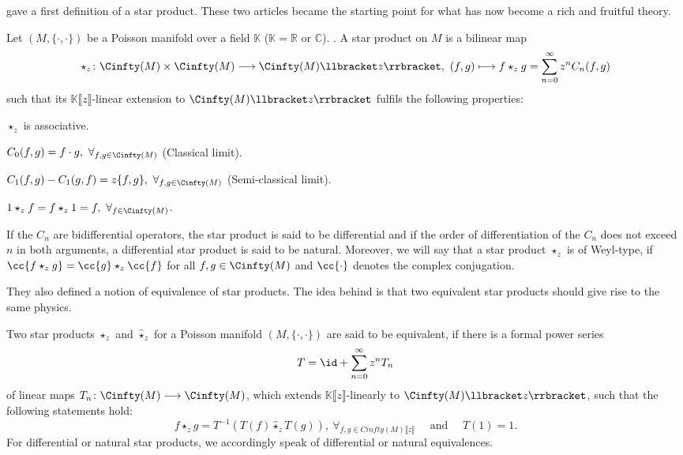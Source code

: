 gave a first definition of a star product. These two articles became the starting 
point for what has now become a rich and fruitful theory.
\begin{definition}
	\label{Def:StarProduct}
	Let $(M, \{\cdot, \cdot\})$ be a Poisson manifold over a field 
	$\mathbb{K}$ ($\mathbb{K} = \mathbb{R}$ or $\mathbb{C}$).
.	A star product on $M$ is a bilinear map
	\begin{equation*}
	    \star_z \colon 
    	\Cinfty(M) 
    	\times 
	    \Cinfty(M) 
	    \longrightarrow
	    \Cinfty(M) \llbracket z \rrbracket
	    , \
	    (f,g) 
	    \longmapsto 
	    f \star_z g 
	    =
	    \sum\limits_{n = 0}^\infty 
	    z^n C_n(f,g)
	\end{equation*}
	such that its $\mathbb{K}\llbracket z \rrbracket$-linear extension to 
	$\Cinfty(M) \llbracket z \rrbracket$ fulfils the following properties:
	\begin{definitionlist}
		\item
		$\star_z$ is associative.
		
		\item
		$C_0(f, g) = f \cdot g,\ \forall_{f,g \in \Cinfty(M)}$ (Classical limit).
		
		\item
		$C_1(f, g) - C_1(g, f)= z \{f, g\},\ \forall_{f,g \in \Cinfty(M)}$
		(Semi-classical limit).
		
		\item
		$1 \star_z f = f \star_z 1 = f,\ \forall_{f \in \Cinfty(M)}$.
	\end{definitionlist}
	If the $C_n$ are bidifferential operators, the star product is said to be 
	differential and if the order of differentiation of the $C_n$ does not 
	exceed $n$ in both arguments, a differential star product is said to be 
	natural. Moreover, we will say that a star product $\star_z$ is of Weyl-type,
	if $\cc{f \star_z g} = \cc{g} \star_z \cc{f}$ for all $f,g \in \Cinfty(M)$
	and $\cc{\cdot}$ denotes the complex conjugation.
\end{definition}
They also defined a notion of equivalence of star products. The idea behind is 
that two equivalent star products should give rise to the same physics.
\begin{definition}
	Two star products $\star_z$ and $\widehat{\star}_z$ for a Poisson manifold 
	$(M, \{\cdot, \cdot\})$ are said to be equivalent, if there is a formal 
	power series
	\begin{equation*}
		T
		=
		\id +
		\sum\limits_{n=0}^{\infty}
		z^n T_n
	\end{equation*}
	of linear maps $T_n \colon \Cinfty(M) \longrightarrow \Cinfty(M)$, which 
	extends $\mathbb{K}\llbracket z \rrbracket$-linearly to 
	$\Cinfty(M) \llbracket z \rrbracket$, such that the following statements hold:
	\begin{equation*}
		f \star_z g
		=
		T^{-1}
		\left(
			T(f) \widehat{\star}_z T(g)
		\right)
		, \ 
		\forall_{f,g \in Cinfty(M) \llbracket z \rrbracket}
		\quad \text{ and } \quad
		T(1) 
		= 
		1.
	\end{equation*}
	For differential or natural star products, we accordingly speak of 
	differential or 	natural equivalences.
\end{definition}
